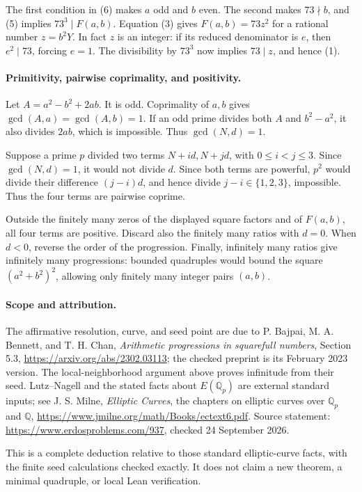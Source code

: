 The first condition in (6) makes \(a\) odd and \(b\) even. The second makes \(73\nmid b\), and (5) implies \(73^3\mid F(a,b)\). Equation (3) gives
\(F(a,b)=73z^2\) for a rational number \(z=b^2Y\). In fact \(z\) is an integer: if its reduced denominator is \(e\), then \(e^2\mid73\), forcing \(e=1\). The divisibility by \(73^3\) now implies \(73\mid z\), and hence (1).

\paragraph{Primitivity, pairwise coprimality, and positivity.}
Let \(A=a^2-b^2+2ab\). It is odd. Coprimality of \(a,b\) gives \(\gcd(A,a)=\gcd(A,b)=1\). If an odd prime divides both \(A\) and \(b^2-a^2\), it also divides \(2ab\), which is impossible. Thus \(\gcd(N,d)=1\).

Suppose a prime \(p\) divided two terms \(N+id,N+jd\), with \(0\leq i<j\leq3\). Since \(\gcd(N,d)=1\), it would not divide \(d\). Since both terms are powerful, \(p^2\) would divide their difference \((j-i)d\), and hence divide \(j-i\in\{1,2,3\}\), impossible. Thus the four terms are pairwise coprime.

Outside the finitely many zeros of the displayed square factors and of \(F(a,b)\), all four terms are positive. Discard also the finitely many ratios with \(d=0\). When \(d<0\), reverse the order of the progression. Finally, infinitely many ratios give infinitely many progressions: bounded quadruples would bound the square \((a^2+b^2)^2\), allowing only finitely many integer pairs \((a,b)\).

\paragraph{Scope and attribution.}
The affirmative resolution, curve, and seed point are due to P. Bajpai, M. A. Bennett, and T. H. Chan, \emph{Arithmetic progressions in squarefull numbers}, Section 5.3, \url{https://arxiv.org/abs/2302.03113}; the checked preprint is its February 2023 version. The local-neighborhood argument above proves infinitude from their seed. Lutz--Nagell and the stated facts about \(E(\mathbb Q_p)\) are external standard inputs; see J. S. Milne, \emph{Elliptic Curves}, the chapters on elliptic curves over \(\mathbb Q_p\) and \(\mathbb Q\), \url{https://www.jmilne.org/math/Books/ectext6.pdf}. Source statement: \url{https://www.erdosproblems.com/937}, checked 24 September 2026.

This is a complete deduction relative to those standard elliptic-curve facts, with the finite seed calculations checked exactly. It does not claim a new theorem, a minimal quadruple, or local Lean verification.
